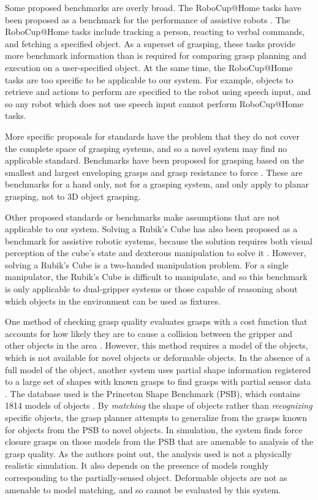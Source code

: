 \documentclass[letterpaper, 10 pt, conference]{ieeeconf}
\begin{document}
Some proposed benchmarks are overly broad.
The RoboCup@Home tasks have been proposed as a benchmark for the performance of assistive robots \cite{stuckler2012demonstrating}. 
The RoboCup@Home tasks include tracking a person, reacting to verbal commands, and fetching a specified object. 
As a superset of grasping, these tasks provide more benchmark information than is required for comparing grasp planning and execution on a user-specified object.
At the same time, the RoboCup@Home tasks are too specific to be applicable to our system. 
For example, objects to retrieve and actions to perform are specified to the robot using speech input, and so any robot which does not use speech input cannot perform RoboCup@Home tasks. 

More specific proposals for standards have the problem that they do not cover the complete space of grasping systems, and so a novel system may find no applicable standard. 
Benchmarks have been proposed for grasping based on the smallest and largest enveloping grasps and grasp resistance to force \cite{kragten2010proposal}. 
These are benchmarks for a hand only, not for a grasping system, and only apply to planar grasping, not to 3D object grasping. 

Other proposed standards or benchmarks make assumptions that are not applicable to our system. 
Solving a Rubik's Cube has also been proposed as a benchmark for assistive robotic systems, because the solution requires both visual perception of the cube's state and dexterous manipulation to solve it \cite{zielinski2006rubik}. 
However, solving a Rubik's Cube is a two-handed manipulation problem. 
For a single manipulator, the Rubik's Cube is difficult to manipulate, and so this benchmark is only applicable to dual-gripper systems or those capable of reasoning about which objects in the environment can be used as fixtures. 

One method of checking grasp quality evaluates grasps with a cost function that accounts for how likely they are to cause a collision between the gripper and other objects in the area \cite{berenson2008grasp}. 
However, this method requires a model of the objects, which is not available for novel objects or deformable objects.
In the absence of a full model of the object, another system uses partial shape information registered to a large set of shapes with known grasps to find grasps with partial sensor data \cite{goldfeder2009data}. 
The database used is the Princeton Shape Benchmark (PSB), which contains 1814 models of objects \cite{shilane2004princeton}.  
By \emph{matching} the shape of objects rather than \emph{recognizing} specific objects, the grasp planner attempts to generalize from the grasps known for objects from the PSB to novel objects. 
In simulation, the system finds force closure grasps on those models from the PSB that are amenable to analysis of the grasp quality. 
As the authors point out, the analysis used is not a physically realistic simulation. 
It also depends on the presence of models roughly corresponding to the partially-sensed object.
Deformable objects are not as amenable to model matching, and so cannot be evaluated by this system. 
\end{document}
